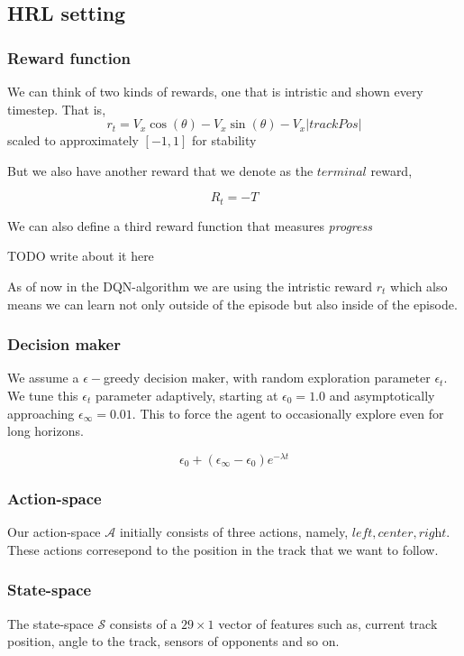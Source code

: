\documentclass{article}
\begin{document}
\subsection{HRL setting}

\subsubsection{Reward function}

We can think of two kinds of rewards, one that is intristic and shown every timestep. That is,  
\[
r_t = V_x \cos(\theta) - V_x\sin(\theta)-V_x|trackPos|
\]
scaled to approximately $[-1,1]$ for stability

But we also have another reward that we denote as the $\textit{terminal}$ reward,

\[
R_t = -T
\]

We can also define a third reward function that measures \textit{progress}

TODO write about it here

As of now in the DQN-algorithm we are using the intristic reward $r_t$ which also means we can learn not only outside of the episode but also inside of the episode.

\subsubsection{Decision maker}
We assume a $\epsilon-$greedy decision maker, with random exploration parameter $\epsilon_t$. We tune this $\epsilon_t$ parameter adaptively, starting at $\epsilon_0 = 1.0$ and asymptotically approaching $\epsilon_\infty = 0.01$. This to force the agent to occasionally explore even for long horizons.

\[
	\epsilon_0 + (\epsilon_\infty - \epsilon_0) e^{-\lambda t}
\]


\subsubsection{Action-space}
Our action-space $\mathcal{A}$ initially consists of three actions, namely, $\textit{left}, \textit{center}, \textit{right}$. These actions corresepond to the position in the track that we want to follow. 

\subsubsection{State-space}
The state-space $\mathcal{S}$ consists of a $29\times1$ vector of features such as, current track position, angle to the track, sensors of opponents and so on.
\end{document}
